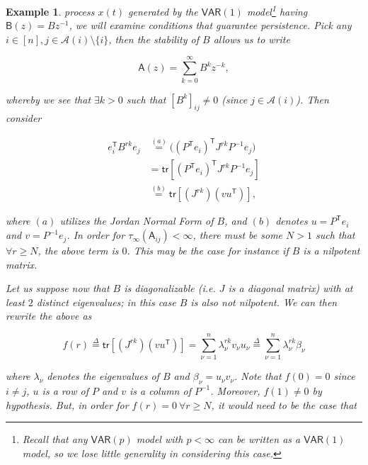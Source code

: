 \documentclass{statsoc}
\def\VAR{\mathsf{VAR}}  %
\def\B{\mathsf{B}}  %
\def\A{\mathsf{A}}  %
\newcommand{\anc}[1]{\mathcal{A}(#1)}  %
\newtheorem{example}{Example}
\def\defeq{\overset{\Delta}{=}}  %
\def\tr{\mathsf{tr }}  %
\def\T{\mathsf{T}}  %
\begin{document}
\begin{example}
  \label{ex:persistent_system}
  process $x(t)$ generated by the $\VAR(1)$ model\footnote{Recall that
    any $\VAR(p)$ model with $p < \infty$ can be written as a
    $\VAR(1)$ model, so we lose little generality in considering this
    case.}  having $\B(z) = Bz^{-1}$, we will examine
  conditions that guarantee persistence.  Pick any
  $i \in [n], j \in \anc{i} \setminus \{i\}$, then the stability of
  $B$ allows us to write

  \begin{equation*}
    \A(z) = \sum_{k = 0}^\infty B^k z^{-k},
  \end{equation*}

  whereby we see that $\exists k > 0$ such that $[B^k]_{ij} \ne 0$
  (since $j \in \anc{i}$).  Then consider

  \begin{equation*}
    \begin{aligned}
      e_i^\T B^{rk} e_j &\overset{(a)}{=} \big((P^\T e_i)^\T J^{rk} P^{-1}e_j\big)\\
      &= \tr [(P^\T e_i)^\T J^{rk} P^{-1}e_j]\\
      &\overset{(b)}{=} \tr [(J^{rk}) (v u^\T)],
    \end{aligned}
  \end{equation*}

  where $(a)$ utilizes the Jordan Normal Form of $B$, and $(b)$
  denotes $u = P^\T e_i$ and $v = P^{-1}e_j$.  In order for
  $\tau_\infty(\A_{ij}) < \infty$, there must be some $N > 1$ such
  that $\forall r \ge N$, the above term is $0$.  This may be the case
  for instance if $B$ is a nilpotent matrix.  

  Let us suppose now that $B$ is diagonalizable (i.e. $J$ is a
  diagonal matrix) with at least $2$ distinct eigenvalues; in this
  case $B$ is also \textit{not} nilpotent.  We can then rewrite the
  above as

  \begin{equation*}
    f(r) \defeq \tr [(J^{rk}) (v u^\T)] = \sum_{\nu = 1}^n \lambda_\nu ^{rk} v_\nu u_\nu \defeq \sum_{\nu = 1}^n \lambda_\nu^{rk} \beta_\nu
  \end{equation*}

  where $\lambda_\nu$ denotes the eigenvalues of $B$ and
  $\beta_\nu = u_\nu v_\nu$.  Note that $f(0) = 0$ since $i \ne j$,
  $u$ is a row of $P$ and $v$ is a column of $P^{-1}$.  Moreover,
  $f(1) \ne 0$ by hypothesis.  But, in order for
  $f(r) = 0\ \forall r \ge N$, it would need to be the case that


\end{example}
\end{document}
